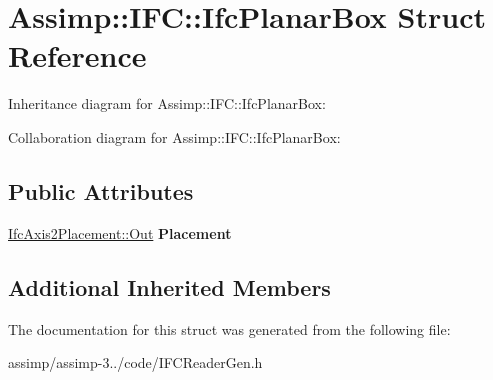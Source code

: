 \hypertarget{struct_assimp_1_1_i_f_c_1_1_ifc_planar_box}{\section{Assimp\+:\+:I\+F\+C\+:\+:Ifc\+Planar\+Box Struct Reference}
\label{struct_assimp_1_1_i_f_c_1_1_ifc_planar_box}
}


Inheritance diagram for Assimp\+:\+:I\+F\+C\+:\+:Ifc\+Planar\+Box\+:


Collaboration diagram for Assimp\+:\+:I\+F\+C\+:\+:Ifc\+Planar\+Box\+:
\subsection*{Public Attributes}
\begin{DoxyCompactItemize}
\item 
\hypertarget{struct_assimp_1_1_i_f_c_1_1_ifc_planar_box_a9f4915e66100cb3cc64935c70850638a}{\hyperlink{classboost_1_1shared__ptr}{Ifc\+Axis2\+Placement\+::\+Out} {\bfseries Placement}}\label{struct_assimp_1_1_i_f_c_1_1_ifc_planar_box_a9f4915e66100cb3cc64935c70850638a}

\end{DoxyCompactItemize}
\subsection*{Additional Inherited Members}


The documentation for this struct was generated from the following file\+:\begin{DoxyCompactItemize}
\item 
assimp/assimp-\/3../code/I\+F\+C\+Reader\+Gen.\+h\end{DoxyCompactItemize}

